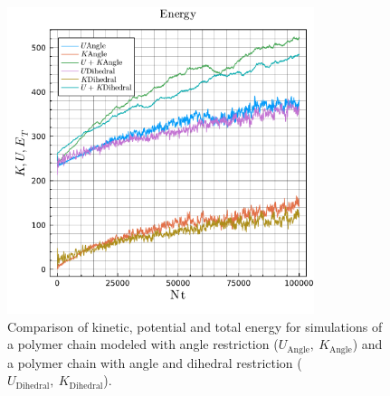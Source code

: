 \documentclass[main.tex]{subfiles}
\begin{document}
\begin{figure}[ht!]
    \centering
    \includegraphics[width=0.8\textwidth]{imgs/hw4/energyComparison.pdf}
    \caption{
        Comparison of kinetic, potential and total energy for simulations of a polymer chain modeled with angle restriction ($U_{\mathrm{Angle}},~K_{\mathrm{Angle}}$) and a polymer chain with angle and dihedral restriction ($U_{\mathrm{Dihedral}},~K_{\mathrm{Dihedral}}$).
    }
    \label{fig:energyAngle}
\end{figure}

\end{document}
